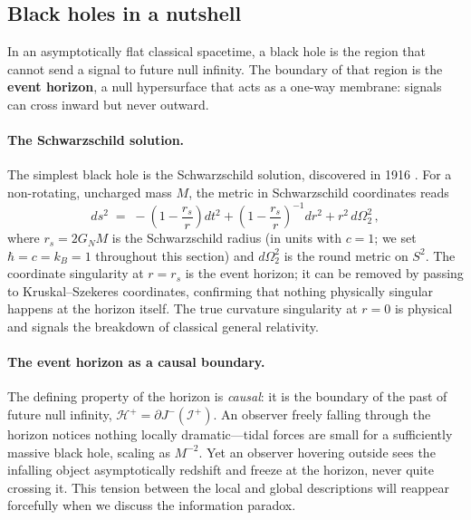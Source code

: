 \documentclass[11pt,letterpaper]{article}
\theoremstyle{plain}
\theoremstyle{definition}
\theoremstyle{remark}
\begin{document}
\subsection{Black holes in a nutshell}\label{subsec03:nutshell}

In an asymptotically flat classical spacetime, a black hole is the region
that cannot send a signal to future null infinity.  The boundary of that region is the \textbf{event horizon},
a null hypersurface that acts as a one-way membrane: signals can cross inward
but never outward.

\paragraph{The Schwarzschild solution.}
The simplest black hole is the Schwarzschild solution, discovered in 1916
\cite{schwarzschild1916}.  For a non-rotating, uncharged mass $M$, the metric
in Schwarzschild coordinates reads
\begin{equation}\label{eq03:schwarzschild}
  ds^{2} \;=\; -\!\left(1 - \frac{r_{s}}{r}\right) dt^{2}
  + \left(1 - \frac{r_{s}}{r}\right)^{-1} dr^{2}
  + r^{2}\, d\Omega_{2}^{2}\,,
\end{equation}
where $r_{s} = 2G_{N}M$ is the Schwarzschild radius (in units with $c = 1$;
we set $\hbar = c = k_{B} = 1$ throughout this section) and $d\Omega_{2}^{2}$
is the round metric on $S^{2}$.  The coordinate singularity at $r = r_{s}$
is the event horizon; it can be removed by passing to Kruskal--Szekeres
coordinates, confirming that nothing physically singular happens at the
horizon itself.  The true curvature singularity at $r = 0$ is physical and
signals the breakdown of classical general relativity.

\paragraph{The event horizon as a causal boundary.}
The defining property of the horizon is \emph{causal}: it is the boundary
of the past of future null infinity, $\mathcal{H}^{+} = \partial
J^{-}(\mathscr{I}^{+})$.  An observer freely falling through the horizon
notices nothing locally dramatic---tidal forces are small for a
sufficiently massive black hole, scaling as $M^{-2}$.  Yet an observer
hovering outside sees the infalling object asymptotically redshift and
freeze at the horizon, never quite crossing it.  This tension between the
local and global descriptions will reappear forcefully when we discuss the
information paradox.
\end{document}
